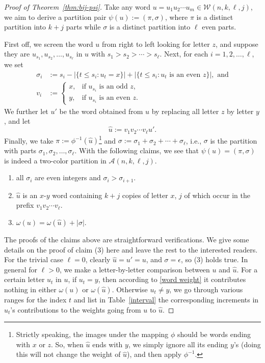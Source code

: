 \documentclass[11pt,reqno]{amsart}
\numberwithin{equation}{section}
\theoremstyle{plain}
\theoremstyle{definition}
\newcommand{\A}{\mathcal{A}}
\newcommand{\W}{\mathcal{W}}
\begin{document}
\begin{proof}[Proof of Theorem~\ref{thm:bij-psi}]
Take any word $u=u_1u_2\cdots u_m\in\W(n,k,\ell,j)$, we aim to derive a partition pair $\psi(u):=(\pi,\sigma)$, where $\pi$ is a distinct partition into $k+j$ parts while $\sigma$ is a distinct partition into $\ell$ even parts. 

First off, we screen the word $u$ from right to left looking for letter $z$, and suppose they are $u_{s_1},u_{s_2},\ldots,u_{s_{\ell}}$ in $u$ with $s_1>s_2>\cdots>s_{\ell}$. Next, for each $i=1,2,\ldots,\ell$, we set
\begin{align*}
\sigma_i &:= s_i-|\{t\le s_i:u_t=x\}|+|\{t\le s_i:\text{$u_t$ is an even $z$}\}|,\text{ and}\\
v_i &:= \begin{cases}
x, & \text{if $u_{s_i}$ is an odd $z$},\\
y, & \text{if $u_{s_i}$ is an even $z$}.
\end{cases}
\end{align*}
We further let $u'$ be the word obtained from $u$ by replacing all letter $z$ by letter $y$, and let $$\hat{u}:=v_1v_2\cdots v_{\ell}u'.$$
Finally, we take $\pi:=\phi^{-1}(\hat{u})$\footnote{Strictly speaking, the images under the mapping $\phi$ should be words ending with $x$ or $z$. So, when $\hat{u}$ ends with $y$, we simply ignore all its ending $y$'s (doing this will not change the weight of $\hat{u}$), and then apply $\phi^{-1}$.} and $\sigma:=\sigma_1+\sigma_2+\cdots+\sigma_{\ell}$, i.e., $\sigma$ is the partition with parts $\sigma_1,\sigma_2,\ldots,\sigma_{\ell}$. With the following claims, we see that $\psi(u)=(\pi,\sigma)$ is indeed a two-color partition in $\A(n,k,\ell,j)$.
\begin{enumerate}
  \item all $\sigma_i$ are even integers and $\sigma_i>\sigma_{i+1}$.
  \item $\hat{u}$ is an $x$-$y$ word containing $k+j$ copies of letter $x$, $j$ of which occur in the prefix $v_1v_2\cdots v_{\ell}$.
  \item $\omega(u)=\omega(\hat{u})+|\sigma|$.
\end{enumerate}
The proofs of the claims above are straightforward verifications. We give some details on the proof of claim (3) here and leave the rest to the interested readers. For the trivial case $\ell=0$, clearly $\hat{u}=u'=u$, and $\sigma=\epsilon$, so (3) holds true. In general for $\ell>0$, we make a letter-by-letter comparison between $u$ and $\hat{u}$. For a certain letter $u_t$ in $u$, if $u_t=y$, then according to \eqref{word weight} it contributes nothing in either $\omega(u)$ or $\omega(\hat{u})$. Otherwise $u_t\neq y$, we go through various ranges for the index $t$ and list in Table~\ref{interval} the corresponding increments in $u_t$'s contributions to the weights going from $u$ to $\hat{u}$.

\end{proof}
\end{document}
